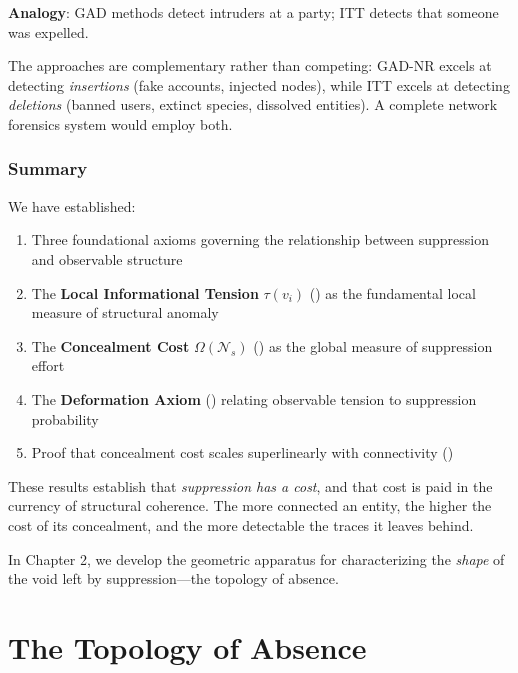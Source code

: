 \documentclass[12pt,a4paper]{article}
\theoremstyle{definition}
\theoremstyle{remark}
\newcommand{\NS}{\mathcal{N}_s}          %
\newcommand{\CO}{\Omega}                  %
\begin{document}
\textbf{Analogy}: GAD methods detect intruders at a party; ITT detects that someone was expelled.

The approaches are complementary rather than competing: GAD-NR excels at detecting \emph{insertions} (fake accounts, injected nodes), while ITT excels at detecting \emph{deletions} (banned users, extinct species, dissolved entities). A complete network forensics system would employ both.

\subsubsection{Summary}

We have established:

\begin{enumerate}
    \item Three foundational axioms governing the relationship between suppression and observable structure
    
    \item The \textbf{Local Informational Tension} $\tau(v_i)$ () as the fundamental local measure of structural anomaly
    
    \item The \textbf{Concealment Cost} $\CO(\NS)$ () as the global measure of suppression effort
    
    \item The \textbf{Deformation Axiom} () relating observable tension to suppression probability
    
    \item Proof that concealment cost scales superlinearly with connectivity ()
\end{enumerate}

These results establish that \emph{suppression has a cost}, and that cost is paid in the currency of structural coherence. The more connected an entity, the higher the cost of its concealment, and the more detectable the traces it leaves behind.

In Chapter 2, we develop the geometric apparatus for characterizing the \emph{shape} of the void left by suppression—the topology of absence.


\newpage
\section{The Topology of Absence}
\end{document}
